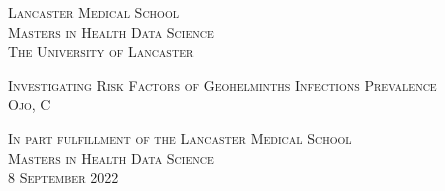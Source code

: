 
\begin{titlepage}

        \begin{center}

            \vspace*{1cm}

            \begin{minipage}{0.95\textwidth}

                \begin{center}
                    {\sffamily \small \textsc{Lancaster Medical School\\Masters in Health Data Science\\The University of Lancaster}}
                    \vspace{3.5cm}

                    {\sffamily \Large \textsc{Investigating Risk Factors of Geohelminths Infections Prevalence}\\
                    \small \textsc{Ojo, C}}
                    \vspace{11.5cm}

                    {\sffamily \small \textsc{In part fulfillment of the Lancaster Medical School\\ Masters in Health
                    Data Science \\ 8 September 2022}}

                \end{center}

            \end{minipage}

        \end{center}

\end{titlepage}